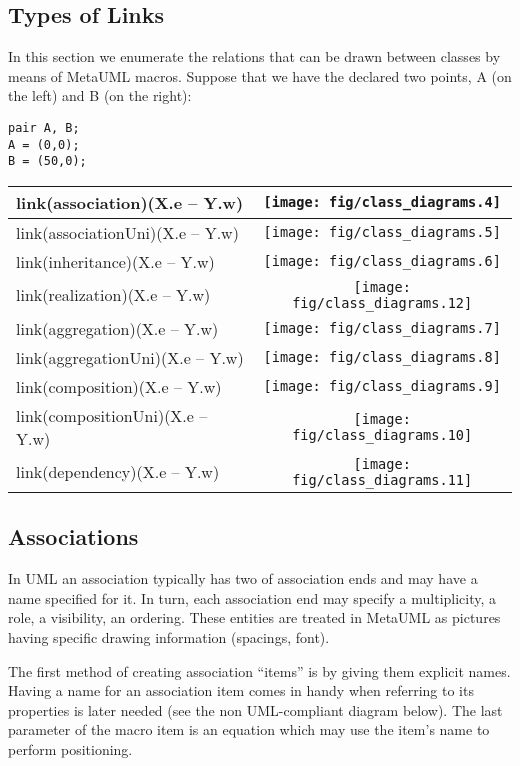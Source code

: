 \documentclass{article}
\newcommand{\code}{\ttfamily}
\begin{document}
\subsection{Types of Links}

In this section we enumerate the relations that can be drawn between classes by means
of MetaUML macros. Suppose that we have the declared two points, {\code A} (on the left)
and {\code B} (on the right):

\begin{verbatim}
pair A, B;
A = (0,0);
B = (50,0);
\end{verbatim}

\begin{tabular}{||l|c||}
\hline
{\code link(association)(X.e -- Y.w)} & \texttt{[image: fig/class\_diagrams.4]} \\
\hline
{\code link(associationUni)(X.e -- Y.w)} & \texttt{[image: fig/class\_diagrams.5]}  \\
\hline
{\code link(inheritance)(X.e -- Y.w)} & \texttt{[image: fig/class\_diagrams.6]} \\
\hline
{\code link(realization)(X.e -- Y.w)} & \texttt{[image: fig/class\_diagrams.12]} \\
\hline
{\code link(aggregation)(X.e -- Y.w)} & \texttt{[image: fig/class\_diagrams.7]} \\
\hline
{\code link(aggregationUni)(X.e -- Y.w)} & \texttt{[image: fig/class\_diagrams.8]} \\
\hline
{\code link(composition)(X.e -- Y.w)} & \texttt{[image: fig/class\_diagrams.9]} \\
\hline
{\code link(compositionUni)(X.e -- Y.w)} & \texttt{[image: fig/class\_diagrams.10]} \\
\hline
{\code link(dependency)(X.e -- Y.w)} & \texttt{[image: fig/class\_diagrams.11]} \\
\hline
\end{tabular}

\subsection{Associations}
In UML an association typically has two of association ends and may have a name specified for it.
In turn, each association end may specify a multiplicity, a role, a visibility, an ordering.
These entities are treated in MetaUML as pictures having specific drawing information
(spacings, font).

The first method of creating association ``items'' is by giving them explicit names.
Having a name for an association item comes in handy when referring to its properties
is later needed (see the non UML-compliant diagram below). The last parameter of the macro {\code item} is an equation which may use the item's name to perform positioning.
\end{document}
